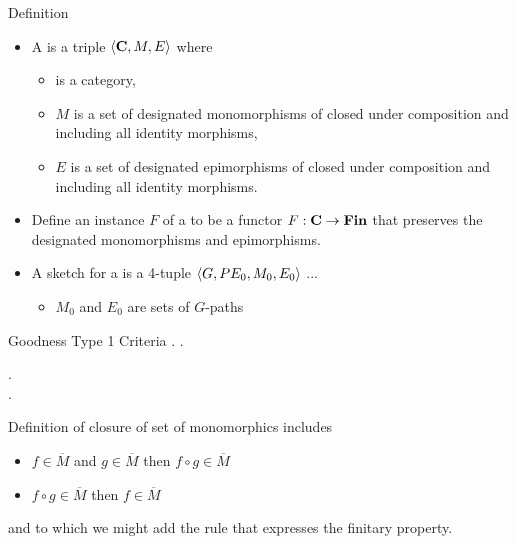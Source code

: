 


\begin{frame}{Definition}
\begin{itemize}
\item A \term{\catMEterm} is a triple $\langle\textbf{C},M,E\rangle$ where 
\begin{itemize}
\item \catcw is a category,
\item $M$ is a set of designated monomorphisms of \catcw closed under composition and including all identity morphisms,
\item $E$ is a set of designated epimorphisms of \catcw closed under composition and including all identity morphisms.
\end{itemize}
\item Define an instance $F$ of a \catMEterm to be a functor $F: \textbf{C} \rightarrow \textbf{Fin}$ 
that preserves the designated monomorphisms and epimorphisms.


\item A sketch for a \catMEterm is a 4-tuple $\langle G,PE_0,M_0,E_0\rangle$ ...
\begin{itemize}
 \item   $M_0$ and $E_0$ are sets of $G$-paths  
\end{itemize}
\end{itemize}
\end{frame}


\begin{frame}{Goodness Type 1 Criteria}
\medskip
\goodnessoneA.
\medskip
\goodnessoneB.

\goodnessoneC. \\
\medskip
\goodnessoneD. \\
\medskip

Definition of closure of set of monomorphics includes
\begin{itemize}
\item $f \in \overline{M}$ and $g \in \overline{M}$ then $f \circ g \in \overline{M}$
\item $f \circ g \in \overline{M}$ then $f \in \overline{M}$
\end{itemize}
and to which we might add the rule that expresses the finitary property.
\end{frame}


